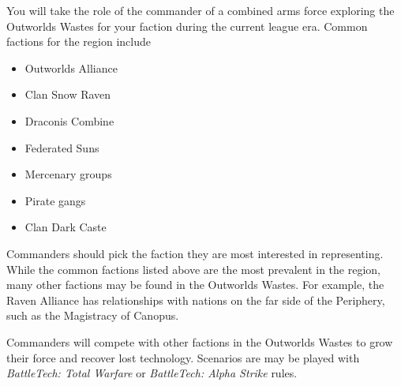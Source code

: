 You will take the role of the commander of a combined arms force exploring the Outworlds Wastes for your faction during the current league era.
Common factions for the region include


\begin{itemize}

\item Outworlds Alliance

\item Clan Snow Raven

\item Draconis Combine

\item Federated Suns

\item Mercenary groups

\item Pirate gangs

\item Clan Dark Caste


\end{itemize}


Commanders should pick the faction they are most interested in representing.
While the common factions listed above are the most prevalent in the region, many other factions may be found in the Outworlds Wastes.
For example, the Raven Alliance has relationships with nations on the far side of the Periphery, such as the Magistracy of Canopus.

Commanders will compete with other factions in the Outworlds Wastes to grow their force and recover lost technology.
Scenarios are may be played with \emph{BattleTech: Total Warfare} or \emph{BattleTech: Alpha Strike} rules.
